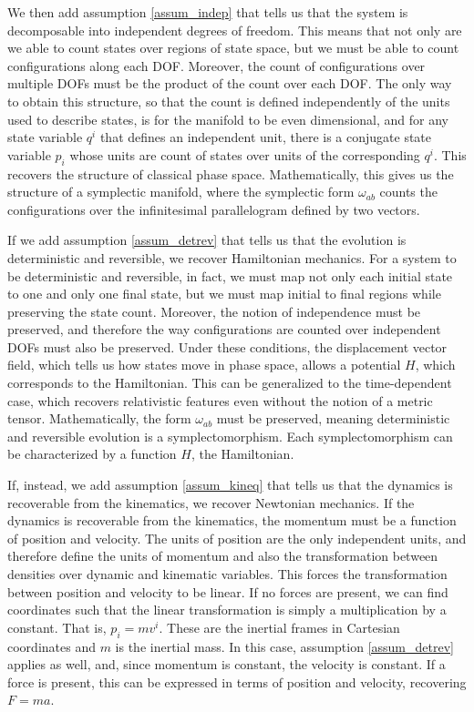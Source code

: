 We then add assumption \ref{assum_indep} that tells us that the system is decomposable into independent degrees of freedom. This means that not only are we able to count states over regions of state space, but we must be able to count configurations along each DOF. Moreover, the count of configurations over multiple DOFs must be the product of the count over each DOF. The only way to obtain this structure, so that the count is defined independently of the units used to describe states, is for the manifold to be even dimensional, and for any state variable $q^i$ that defines an independent unit, there is a conjugate state variable $p_i$ whose units are count of states over units of the corresponding $q^i$. This recovers the structure of classical phase space. Mathematically, this gives us the structure of a symplectic manifold, where the symplectic form $\omega_{ab}$ counts the configurations over the infinitesimal parallelogram defined by two vectors.

If we add assumption \ref{assum_detrev} that tells us that the evolution is deterministic and reversible, we recover Hamiltonian mechanics. For a system to be deterministic and reversible, in fact, we must map not only each initial state to one and only one final state, but we must map initial to final regions while preserving the state count. Moreover, the notion of independence must be preserved, and therefore the way configurations are counted over independent DOFs must also be preserved. Under these conditions, the displacement vector field, which tells us how states move in phase space, allows a potential $H$, which corresponds to the Hamiltonian. This can be generalized to the time-dependent case, which recovers relativistic features even without the notion of a metric tensor. Mathematically, the form $\omega_{ab}$ must be preserved, meaning deterministic and reversible evolution is a symplectomorphism. Each symplectomorphism can be characterized by a function $H$, the Hamiltonian.

If, instead, we add assumption \ref{assum_kineq} that tells us that the dynamics is recoverable from the kinematics, we recover Newtonian mechanics. If the dynamics is recoverable from the kinematics, the momentum must be a function of position and velocity. The units of position are the only independent units, and therefore define the units of momentum and also the transformation between densities over dynamic and kinematic variables. This forces the transformation between position and velocity to be linear. If no forces are present, we can find coordinates such that the linear transformation is simply a multiplication by a constant. That is, $p_i = m v^i$. These are the inertial frames in Cartesian coordinates and $m$ is the inertial mass. In this case, assumption \ref{assum_detrev} applies as well, and, since momentum is constant, the velocity is constant. If a force is present, this can be expressed in terms of position and velocity, recovering $F = m a$.

